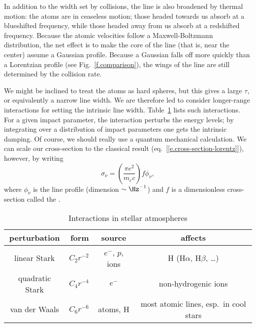 In addition to the width set by collisions, the line is also broadened by thermal motion: the atoms are in ceaseless motion; those headed towards us absorb at a blueshifted frequency, while those headed away from us absorb at a redshifted frequency.  Because the atomic velocities follow a Maxwell-Boltzmann distribution, the net effect is to make the core of the line (that is, near the center) assume a Gaussian profile.  Because a Gaussian falls off more quickly than a Lorentzian profile (see Fig.~\ref{f.comparison}), the wings of the line are still determined by the collision rate.

We might be inclined to treat the atoms as hard spheres, but this gives a large $\tau$, or equivalently a narrow line width. We are therefore led to consider longer-range interactions for setting the intrinsic line width. Table~\ref{t.perturbers} lists such interactions. For a given impact parameter, the interaction perturbs the energy levels; by integrating over a distribution of  impact parameters one gets the intrinsic damping. Of course, we should really use a quantum mechanical calculation.  We can scale our cross-section to the classical result (eq.~[\ref{e.cross-section-lorentz}]), however, by writing
\begin{equation}\label{e.cross-section}
	 \sigma_{\nu} = \left(\frac{\pi e^{2}}{m_{e}c}\right) f \phi_{\nu}, 
\end{equation}
where $\phi_{\nu}$ is the line profile (dimension $\sim \Hz^{-1}$) and $f$ is a dimensionless cross-section called the .

\begin{table}[htbp]
\caption{Interactions in stellar atmospheres}\label{t.perturbers}
\begin{tabular}{crcc}
\hline
perturbation & form & source & affects\\
\hline\hline
linear Stark & $C_{2} r^{-2}$ & $e^{-}$, $p$, ions & H (H$\alpha$, H$\beta$, \ldots)\\
quadratic Stark & $C_{4} r^{-4}$ & $e^{-}$ & non-hydrogenic ions\\
van der Waals & $C_{6}r^{-6}$ & atoms, H & most atomic lines, esp.\ in cool stars\\
\hline
\end{tabular}
\end{table}
